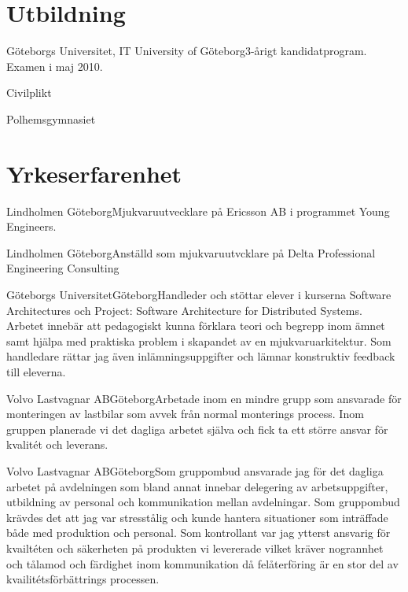 \documentclass[11pt,a4paper]{moderncv}
\begin{document}
\maketitle

\section{Utbildning}
{Göteborgs Universitet, IT University of Göteborg}{}{}{3-årigt
  kandidatprogram. Examen i maj 2010.}

{Civilplikt}{}{}{}

{Polhemsgymnasiet}{}{}{}

\section{Yrkeserfarenhet}
 {Lindholmen}
  {Göteborg}{}{Mjukvaruutvecklare på Ericsson AB i programmet Young Engineers.}

 {Lindholmen}
  {Göteborg}{}{Anställd som mjukvaruutvcklare på Delta Professional Engineering Consulting}

 {Göteborgs
  Universitet}{Göteborg}{}{Handleder och stöttar elever i
  kurserna Software Architectures och Project: Software Architecture
  for Distributed Systems.  Arbetet innebär att pedagogiskt kunna
  förklara teori och begrepp inom ämnet samt hjälpa med praktiska
  problem i skapandet av en mjukvaruarkitektur. Som handledare rättar
  jag även inlämningsuppgifter och lämnar konstruktiv feedback till
  eleverna.}

{Volvo Lastvagnar AB}{Göteborg}{}{Arbetade inom en mindre grupp som ansvarade för monteringen av lastbilar som avvek från normal
monterings process. Inom gruppen planerade vi det dagliga arbetet själva och fick ta ett större
ansvar för kvalitét och leverans.}

 {Volvo Lastvagnar
  AB}{Göteborg}{}{Som gruppombud ansvarade jag för det dagliga arbetet
  på avdelningen som bland annat innebar delegering av
  arbetsuppgifter, utbildning av personal och kommunikation mellan
  avdelningar. Som gruppombud krävdes det att jag var stresstålig och
  kunde hantera situationer som inträffade både med produktion och
  personal. Som kontrollant var jag ytterst ansvarig för kvailtéten
  och säkerheten på produkten vi levererade vilket kräver nogrannhet
  och tålamod och färdighet inom kommunikation då felåterföring är en
  stor del av kvailitétsförbättrings processen.}
\end{document}
